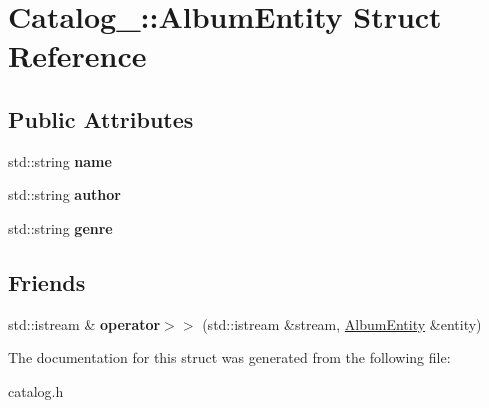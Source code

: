\hypertarget{struct_catalog___1_1_album_entity}{}\section{Catalog\+\_\+\+:\+:Album\+Entity Struct Reference}
\label{struct_catalog___1_1_album_entity}
\subsection*{Public Attributes}
\begin{DoxyCompactItemize}
\item 
std\+::string {\bfseries name}\hypertarget{struct_catalog___1_1_album_entity_ac220f4c0491537f157341586f72ac361}{}\label{struct_catalog___1_1_album_entity_ac220f4c0491537f157341586f72ac361}

\item 
std\+::string {\bfseries author}\hypertarget{struct_catalog___1_1_album_entity_a6028eca157f1d9f6fe4f20e07a65f488}{}\label{struct_catalog___1_1_album_entity_a6028eca157f1d9f6fe4f20e07a65f488}

\item 
std\+::string {\bfseries genre}\hypertarget{struct_catalog___1_1_album_entity_a76df9314ecc088b70534547692b64e05}{}\label{struct_catalog___1_1_album_entity_a76df9314ecc088b70534547692b64e05}

\end{DoxyCompactItemize}
\subsection*{Friends}
\begin{DoxyCompactItemize}
\item 
std\+::istream \& {\bfseries operator$>$$>$} (std\+::istream \&stream, \hyperlink{struct_catalog___1_1_album_entity}{Album\+Entity} \&entity)\hypertarget{struct_catalog___1_1_album_entity_a7b4f9b13362aa17219396935907e9337}{}\label{struct_catalog___1_1_album_entity_a7b4f9b13362aa17219396935907e9337}

\end{DoxyCompactItemize}


The documentation for this struct was generated from the following file\+:\begin{DoxyCompactItemize}
\item 
catalog.\+h\end{DoxyCompactItemize}
